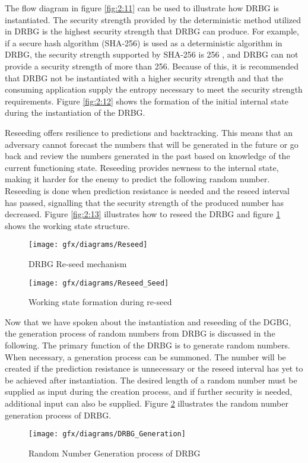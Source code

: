 The flow diagram in figure \ref{fig:2:11} can be used to illustrate how DRBG is instantiated. The security strength provided by the deterministic method utilized in DRBG is the highest security strength that DRBG can produce. For example, if a secure hash algorithm (SHA-256) is used as a deterministic algorithm in DRBG, the security strength supported by SHA-256 is 256 \cite{SP90A-2015}, and DRBG can not provide a security strength of more than 256. Because of this, it is recommended that DRBG not be instantiated with a higher security strength and that the consuming application supply the entropy necessary to meet the security strength requirements. Figure \ref{fig:2:12} shows the formation of the initial internal state during the instantiation of the DRBG.

Reseeding offers resilience to predictions and backtracking. This means that an adversary cannot forecast the numbers that will be generated in the future or go back and review the numbers generated in the past based on knowledge of the current functioning state. Reseeding provides newness to the internal state, making it harder for the enemy to predict the following random number. Reseeding is done when prediction resistance is needed and the reseed interval has passed, signalling that the security strength of the produced number has decreased. Figure \ref{fig:2:13} illustrates how to reseed the DRBG and figure \ref{fig:2:14} shows the working state structure.
\begin{figure}[!h]
	\centering
	\begin{minipage}[b]{5 cm}
		\texttt{[image: gfx/diagrams/Reseed]} 
		\caption{DRBG Re-seed mechanism}
		\label{fig:2:13}
	\end{minipage}
	\begin{minipage}[b]{5 cm}
		\texttt{[image: gfx/diagrams/Reseed\_Seed]}  
		\caption{Working state formation during re-seed}
		\label{fig:2:14}
	\end{minipage}
\end{figure}

Now that we have spoken about the instantiation and reseeding of the DGBG, the generation process of random numbers from DRBG is discussed in the following. The primary function of the DRBG is to generate random numbers. When necessary, a generation process can be summoned. The number will be created if the prediction resistance is unnecessary or the reseed interval has yet to be achieved after instantiation. The desired length of a random number must be supplied as input during the creation process, and if further security is needed, additional input can also be supplied. Figure \ref{fig:2:15} illustrates the random number generation process of DRBG.
\begin{figure}[!h]
	\centering
	\texttt{[image: gfx/diagrams/DRBG\_Generation]}
	\caption{Random Number Generation process of DRBG}
	\label{fig:2:15}
\end{figure}

